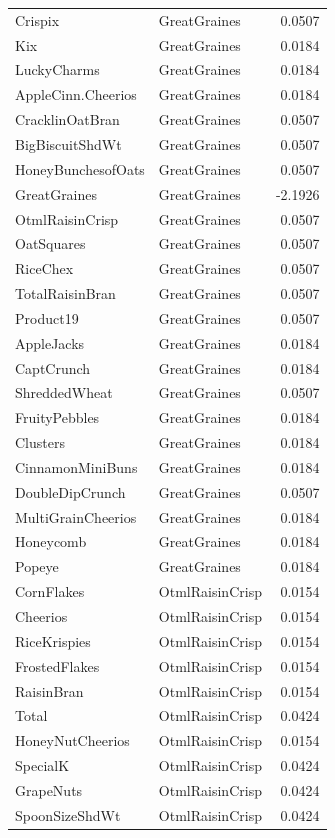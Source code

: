 \begin{longtable}{llr}
Crispix & GreatGraines & 0.0507 \\
Kix & GreatGraines & 0.0184 \\
LuckyCharms & GreatGraines & 0.0184 \\
AppleCinn.Cheerios & GreatGraines & 0.0184 \\
CracklinOatBran & GreatGraines & 0.0507 \\
BigBiscuitShdWt & GreatGraines & 0.0507 \\
HoneyBunchesofOats & GreatGraines & 0.0507 \\
GreatGraines & GreatGraines & -2.1926 \\
OtmlRaisinCrisp & GreatGraines & 0.0507 \\
OatSquares & GreatGraines & 0.0507 \\
RiceChex & GreatGraines & 0.0507 \\
TotalRaisinBran & GreatGraines & 0.0507 \\
Product19 & GreatGraines & 0.0507 \\
AppleJacks & GreatGraines & 0.0184 \\
CaptCrunch & GreatGraines & 0.0184 \\
ShreddedWheat & GreatGraines & 0.0507 \\
FruityPebbles & GreatGraines & 0.0184 \\
Clusters & GreatGraines & 0.0184 \\
CinnamonMiniBuns & GreatGraines & 0.0184 \\
DoubleDipCrunch & GreatGraines & 0.0507 \\
MultiGrainCheerios & GreatGraines & 0.0184 \\
Honeycomb & GreatGraines & 0.0184 \\
Popeye & GreatGraines & 0.0184 \\
CornFlakes & OtmlRaisinCrisp & 0.0154 \\
Cheerios & OtmlRaisinCrisp & 0.0154 \\
RiceKrispies & OtmlRaisinCrisp & 0.0154 \\
FrostedFlakes & OtmlRaisinCrisp & 0.0154 \\
RaisinBran & OtmlRaisinCrisp & 0.0154 \\
Total & OtmlRaisinCrisp & 0.0424 \\
HoneyNutCheerios & OtmlRaisinCrisp & 0.0154 \\
SpecialK & OtmlRaisinCrisp & 0.0424 \\
GrapeNuts & OtmlRaisinCrisp & 0.0424 \\
SpoonSizeShdWt & OtmlRaisinCrisp & 0.0424 \\

\end{longtable}
